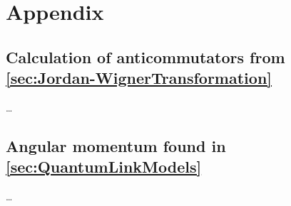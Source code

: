 \documentclass[<path to main>main.tex]{subfiles} %
\begin{document}
\clearpage %

\chapter*{Appendix}



\section{Calculation of anticommutators from \cref{sec:Jordan-WignerTransformation}}

\ldots




\section{Angular momentum found in \cref{sec:QuantumLinkModels}}

\ldots
\end{document}
